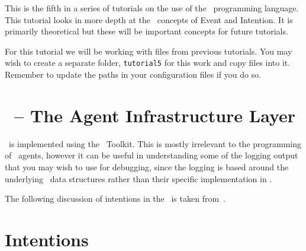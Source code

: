 
This is the fifth in a series of tutorials on the use of the \gwendolen\ programming language.  This tutorial looks in more depth at the \gwendolen\ concepts of Event and Intention.  It is primarily theoretical but these will be important concepts for future tutorials.

For this tutorial we will be working with files from previous tutorials.  You may wish to create a separate folder, \texttt{tutorial5} for this work and copy files into it.  Remember to update the paths in your configuration files if you do so.

\section{\ail\ -- The Agent Infrastructure Layer}

\gwendolen\ is implemented using the \ail\ Toolkit.  This is mostly irrelevant to the programming of \gwendolen\ agents, however it can be useful in understanding some of the logging output that you may wish to use for debugging, since the logging is based around the underlying \java\ data structures rather than their specific implementation in \gwendolen.

\begin{sloppypar}
The following discussion of intentions in the \ail\ is taken from~\cite{springerlink:10.1007/s10515-011-0088-x}.
\end{sloppypar}

\section{Intentions}

